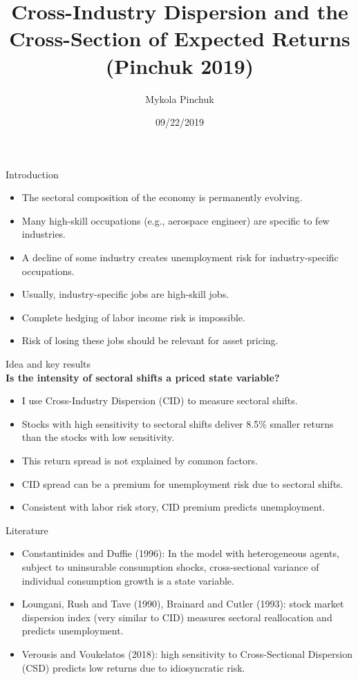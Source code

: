 \documentclass{beamer}
\title{Cross-Industry Dispersion and the Cross-Section of Expected Returns \\ (Pinchuk 2019)}
\author{Mykola Pinchuk}
\date{09/22/2019}
\begin{document}
\begin{frame}
  \titlepage
\end{frame}


\begin{frame}{Introduction}
\begin{itemize}
    \item {The sectoral composition of the economy is permanently evolving.}
    \item {Many high-skill occupations (e.g., aerospace engineer) are specific to few industries.}
    \item {A decline of some industry creates unemployment risk for industry-specific occupations.}
    \item {Usually, industry-specific jobs are high-skill jobs.}
    \item {Complete hedging of labor income risk is impossible.}
    \item {Risk of losing these jobs should be relevant for asset pricing.}
\end{itemize}
\end{frame}



\begin{frame}{Idea and key results} \\
\textbf{Is the intensity of sectoral shifts a priced state variable?}
\vspace{0.64cm}
\begin{itemize}
    \item {I use Cross-Industry Dispersion (CID) to measure sectoral shifts.}
    \item {Stocks with high sensitivity to sectoral shifts deliver 8.5\% smaller returns than the stocks with low sensitivity.}
    \item {This return spread is not explained by common factors.}
    \item {CID spread can be a premium for unemployment risk due to sectoral shifts.}
    \item {Consistent with labor risk story, CID premium predicts unemployment.}
\end{itemize}
\end{frame}


\begin{frame}{Literature}
\begin{itemize}
    \item {Constantinides and Duffie (1996): In the model with heterogeneous agents, subject to uninsurable consumption shocks, cross-sectional variance of individual consumption growth is a state variable.}
    \item {Loungani, Rush and Tave (1990), Brainard and Cutler (1993): stock market dispersion index (very similar to CID) measures sectoral reallocation and predicts unemployment.}
    \item {Verousis and Voukelatos (2018): high sensitivity to Cross-Sectional Dispersion (CSD) predicts low returns due to idiosyncratic risk. }
\end{itemize}
\end{frame}
\end{document}
